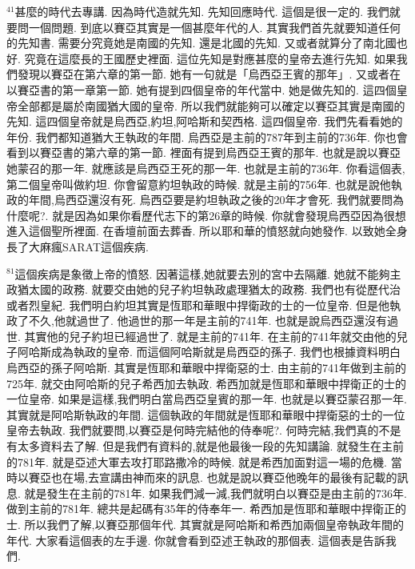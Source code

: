 \documentclass{book}
\begin{document}
$^{41}$甚麼的時代去專講.
因為時代造就先知.
先知回應時代.
這個是很一定的.
我們就要問一個問題.
到底以賽亞其實是一個甚麼年代的人.
其實我們首先就要知道任何的先知書.
需要分究竟她是南國的先知.
還是北國的先知.
又或者就算分了南北國也好.
究竟在這麼長的王國歷史裡面.
這位先知是對應甚麼的皇帝去進行先知.
如果我們發現以賽亞在第六章的第一節.
她有一句就是「烏西亞王賓的那年」.
又或者在以賽亞書的第一章第一節.
她有提到四個皇帝的年代當中.
她是做先知的.
這四個皇帝全部都是屬於南國猶大國的皇帝.
所以我們就能夠可以確定以賽亞其實是南國的先知.
這四個皇帝就是烏西亞,約坦,阿哈斯和契西格.
這四個皇帝.
我們先看看她的年份.
我們都知道猶大王執政的年間.
烏西亞是主前的787年到主前的736年.
你也會看到以賽亞書的第六章的第一節.
裡面有提到烏西亞王賓的那年.
也就是說以賽亞她蒙召的那一年.
就應該是烏西亞王死的那一年.
也就是主前的736年.
你看這個表,第二個皇帝叫做約坦.
你會留意約坦執政的時候.
就是主前的756年.
也就是說他執政的年間,烏西亞還沒有死.
烏西亞要是約坦執政之後的20年才會死.
我們就要問為什麼呢?.
就是因為如果你看歷代志下的第26章的時候.
你就會發現烏西亞因為很想進入這個聖所裡面.
在香壇前面去葬香.
所以耶和華的憤怒就向她發作.
以致她全身長了大麻瘋SARAT這個疾病.

$^{81}$這個疾病是象徵上帝的憤怒.
因著這樣,她就要去別的宮中去隔離.
她就不能夠主政猶太國的政務.
就要交由她的兒子約坦執政處理猶太的政務.
我們也有從歷代治或者烈皇紀.
我們明白約坦其實是恆耶和華眼中捍衛政的士的一位皇帝.
但是他執政了不久,他就過世了.
他過世的那一年是主前的741年.
也就是說烏西亞還沒有過世.
其實他的兒子約坦已經過世了.
就是主前的741年.
在主前的741年就交由他的兒子阿哈斯成為執政的皇帝.
而這個阿哈斯就是烏西亞的孫子.
我們也根據資料明白烏西亞的孫子阿哈斯.
其實是恆耶和華眼中捍衛惡的士.
由主前的741年做到主前的725年.
就交由阿哈斯的兒子希西加去執政.
希西加就是恆耶和華眼中捍衛正的士的一位皇帝.
如果是這樣,我們明白當烏西亞皇賓的那一年.
也就是以賽亞蒙召那一年.
其實就是阿哈斯執政的年間.
這個執政的年間就是恆耶和華眼中捍衛惡的士的一位皇帝去執政.
我們就要問,以賽亞是何時完結他的侍奉呢?.
何時完結,我們真的不是有太多資料去了解.
但是我們有資料的,就是他最後一段的先知講論.
就發生在主前的781年.
就是亞述大軍去攻打耶路撒冷的時候.
就是希西加面對這一場的危機.
當時以賽亞也在場,去宣講由神而來的訊息.
也就是說以賽亞他晚年的最後有記載的訊息.
就是發生在主前的781年.
如果我們減一減,我們就明白以賽亞是由主前的736年.
做到主前的781年.
總共是起碼有35年的侍奉年一.
希西加是恆耶和華眼中捍衛正的士.
所以我們了解,以賽亞那個年代.
其實就是阿哈斯和希西加兩個皇帝執政年間的年代.
大家看這個表的左手邊.
你就會看到亞述王執政的那個表.
這個表是告訴我們.
\end{document}
